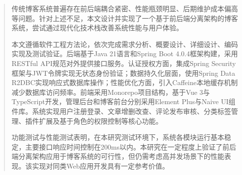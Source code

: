 \documentclass[UTF8,AutoFakeBold=1,AutoFakeSlant,zihao=-4]{SCAU}
\begin{document}
\coverpage      %



\begin{authorization}
\end{authorization}

\begin{abstract}
传统博客系统普遍存在前后端耦合紧密、性能瓶颈明显、后期维护成本偏高等问题。针对上述不足，本文设计并实现了一个基于前后端分离架构的博客系统，尝试通过现代化技术栈改善系统性能与用户体验。

本文遵循软件工程方法论，依次完成需求分析、概要设计、详细设计、编码实现及测试验证。后端基于Java 21语言和Spring Boot 4.0.4框架构建，采用RESTful API规范对外提供接口服务。认证授权方面，集成Spring Security框架与JWT令牌实现无状态身份验证；数据持久化层面，使用Spring Data R2DBC实现响应式数据库操作；性能优化方面，引入Caffeine本地缓存机制减少数据库访问频率。前端采用Monorepo项目结构，基于Vue 3与TypeScript开发，管理后台和博客前台分别采用Element Plus与Naive UI组件库。系统实现用户注册登录、文章增删改查、评论发布审核、分类标签管理、插件扩展及基于角色的权限控制等核心功能。

功能测试与性能测试表明，在本研究测试环境下，系统各模块运行基本稳定，主要接口响应时间控制在200ms以内。本研究在一定程度上验证了前后端分离架构应用于博客系统的可行性，但仍需考虑高并发场景下的性能表现。该实现对同类Web应用开发具有一定参考价值。

\end{abstract}
\end{document}
